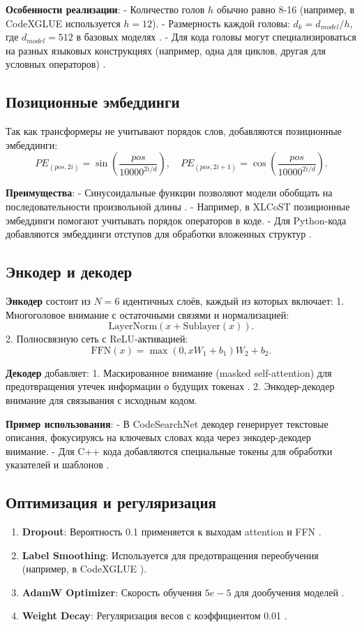 \documentclass[14pt]{article}
\theoremstyle{definition}
\begin{document}
\textbf{Особенности реализации}:
- Количество голов \(h\) обычно равно 8-16 (например, в CodeXGLUE \cite{lu2021codexglue} используется \(h=12\)).
- Размерность каждой головы: \(d_k = d_{model}/h\), где \(d_{model}=512\) в базовых моделях \cite{vaswani2017attention}.
- Для кода головы могут специализироваться на разных языковых конструкциях (например, одна для циклов, другая для условных операторов) \cite{guo2022graphcodebert}.

\subsection{Позиционные эмбеддинги}
Так как трансформеры не учитывают порядок слов, добавляются позиционные эмбеддинги:
\[
PE_{(pos, 2i)} = \sin\left(\frac{pos}{10000^{2i/d}}\right), \quad PE_{(pos, 2i+1)} = \cos\left(\frac{pos}{10000^{2i/d}}\right).
\]

\textbf{Преимущества}:
- Синусоидальные функции позволяют модели обобщать на последовательности произвольной длины \cite{zhu2022}.
- Например, в XLCoST \cite{zhu2022} позиционные эмбеддинги помогают учитывать порядок операторов в коде.
- Для Python-кода добавляются эмбеддинги отступов для обработки вложенных структур \cite{ahmad2021plbart}.

\subsection{Энкодер и декодер}
\textbf{Энкодер} состоит из \(N=6\) идентичных слоёв, каждый из которых включает:
1. Многоголовое внимание с остаточными связями и нормализацией:
\[
\text{LayerNorm}(x + \text{Sublayer}(x)).
\]
2. Полносвязную сеть с ReLU-активацией:
\[
\text{FFN}(x) = \max(0, xW_1 + b_1)W_2 + b_2.
\]

\textbf{Декодер} добавляет:
1. Маскированное внимание (masked self-attention) для предотвращения утечек информации о будущих токенах \cite{lu2021codexglue}.
2. Энкодер-декодер внимание для связывания с исходным кодом.

\textbf{Пример использования}:
- В CodeSearchNet \cite{husain2019codesearchnet} декодер генерирует текстовые описания, фокусируясь на ключевых словах кода через энкодер-декодер внимание.
- Для C++ кода добавляются специальные токены для обработки указателей и шаблонов \cite{karampatsis2020big}.

\subsection{Оптимизация и регуляризация}
\begin{enumerate}
    \item \textbf{Dropout}: Вероятность 0.1 применяется к выходам attention и FFN \cite{vaswani2017attention}.
    \item \textbf{Label Smoothing}: Используется для предотвращения переобучения (например, в CodeXGLUE \cite{lu2021codexglue}).
    \item \textbf{AdamW Optimizer}: Скорость обучения \(5e-5\) для дообучения моделей \cite{liu2022survey}.
    \item \textbf{Weight Decay}: Регуляризация весов с коэффициентом 0.01 \cite{hu2022lora}.
\end{enumerate}
\end{document}
